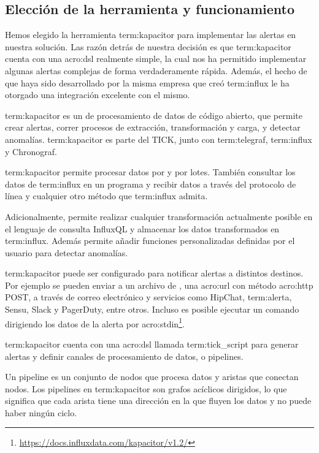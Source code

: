 \subsection{Elección de la herramienta y funcionamiento}
\label{eleccion-herramienta}

Hemos elegido la herramienta \gls{term:kapacitor} para implementar las alertas
en nuestra solución. Las razón detrás de nuestra decisión es que
\gls{term:kapacitor} cuenta con una \gls{acro:dsl} realmente simple, la cual
nos ha permitido implementar algunas alertas complejas de forma verdaderamente
rápida. Además, el hecho de que haya sido desarrollado por la misma empresa
que creó \gls{term:influx} le ha otorgado una integración excelente con el
mismo.

\gls{term:kapacitor} es un  de procesamiento de datos de código
abierto, que permite crear alertas, correr procesos de extracción,
transformación y carga, y detectar anomalías. \gls{term:kapacitor} es parte del
 TICK, junto con \gls{term:telegraf}, \gls{term:influx} y Chronograf.

\gls{term:kapacitor} permite procesar datos por  y por lotes. También
consultar los datos de \gls{term:influx} en un programa y recibir datos a
través del protocolo de línea y cualquier otro método que \gls{term:influx}
admita.

Adicionalmente, permite realizar cualquier transformación actualmente posible en
el lenguaje de consulta InfluxQL y almacenar los datos transformados en
\gls{term:influx}. Además permite añadir funciones personalizadas definidas por
el usuario para detectar anomalías.

\gls{term:kapacitor} puede ser configurado para notificar alertas a distintos
destinos.  Por ejemplo se pueden enviar a un archivo de , una \gls{acro:url} con
método \gls{acro:http} POST, a través de correo electrónico y servicios como
HipChat, \gls{term:alerta}, Sensu, Slack y PagerDuty, entre otros. Incluso es
posible ejecutar un comando dirigiendo los datos de la alerta por
\gls{acro:stdin}\footnote{\url{https://docs.influxdata.com/kapacitor/v1.2/}}.

\gls{term:kapacitor} cuenta con una \gls{acro:dsl} llamada \gls{term:tick_script} para
generar alertas y definir canales de procesamiento de datos, o pipelines.

Un pipeline es un conjunto de nodos que procesa datos y
aristas que conectan nodos. Los pipelines en \gls{term:kapacitor} son grafos
acíclicos dirigidos, lo que significa que cada arista tiene una dirección en la
que fluyen los datos y no puede haber ningún ciclo.

